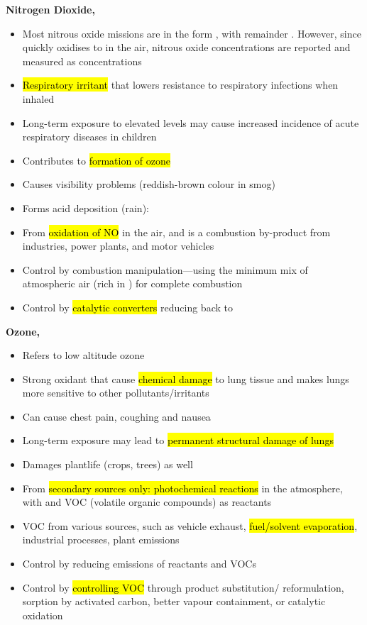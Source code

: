 \documentclass{article}
\newcommand{\headingsmall}[1]{{\small\textbf{#1}}}
\begin{document}
\begin{multicols*}{4}
\headingsmall{Nitrogen Dioxide, }
\begin{itemize} \itemsep -0.5em
    \item Most nitrous oxide missions are in the form , with remainder
        . However, since  quickly oxidises to  in
        the air, nitrous oxide concentrations are reported and measured as
         concentrations
    \item \hl{Respiratory irritant} that lowers resistance to respiratory
        infections when inhaled
    \item Long-term exposure to elevated levels may cause increased
        incidence of acute respiratory diseases in children
    \item Contributes to \hl{formation of ozone}
    \item Causes visibility problems (reddish-brown colour in smog)
    \item Forms acid deposition (rain): 
    \item From \hl{oxidation of NO} in the air, and  is a combustion
        by-product from industries, power plants, and motor vehicles
    \item Control by combustion manipulation---using the minimum mix of
        atmospheric air (rich in ) for complete combustion
    \item Control by \hl{catalytic converters} reducing  back to 
\end{itemize}

\headingsmall{Ozone, }
\begin{itemize} \itemsep -0.5em
    \item Refers to low altitude ozone
    \item Strong oxidant that cause \hl{chemical damage} to lung tissue
        and makes lungs more sensitive to other pollutants/irritants
    \item Can cause chest pain, coughing and nausea
    \item Long-term exposure may lead to \hl{permanent structural damage of lungs}
    \item Damages plantlife (crops, trees) as well
    \item From \hl{secondary sources only: photochemical reactions} in the atmosphere,
        with  and VOC (volatile organic compounds) as reactants
    \item VOC from various sources, such as vehicle exhaust, \hl{fuel/solvent
        evaporation}, industrial processes, plant emissions
    \item Control by reducing emissions of reactants  and VOCs
    \item Control by \hl{controlling VOC} through product substitution/
        reformulation, sorption by activated carbon, better vapour containment, or
        catalytic oxidation
\end{itemize}


\end{multicols*}
\end{document}
